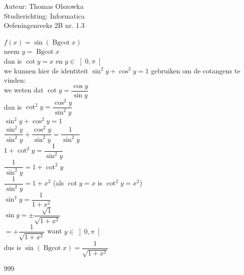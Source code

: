\documentclass[a4paper]{article}
\newcommand{\Bgcot}{\operatorname{Bgcot}}
\begin{document}
\noindent \large Auteur: Thomas Olszowka \\
\noindent \large Studierichting: Informatica\\
\noindent \large Oefeningenreeks 2B nr. 1.3\\

\medskip

\normalsize

$f(x) = \sin(\Bgcot x)$ \\

neem $y = \Bgcot x$ \\

dan is $\cot y = x$ en $y \in \left]0, \pi\right[ $\\

we kunnen hier de identiteit $\sin^2y + \cos^2y  = 1$ gebruiken om de cotangens te vinden: \\

we weten dat $\cot y = \dfrac{\cos y}{\sin y}$ \\

dan is $\cot^2 y = \dfrac{\cos^2 y}{\sin^2 y}$ \\

$\sin^2y + \cos^2y  = 1$\\

$\dfrac{\sin^2 y}{\sin^2 y} + \dfrac{\cos^2 y}{\sin^2 y} = \dfrac{1}{\sin^2 y}$ \\

$1 + \cot^2 y = \dfrac{1}{\sin^2 y}$ \\

$\dfrac{1}{\sin^2 y} = 1 + \cot^2 y$\\

$\dfrac{1}{\sin^2 y}= 1 + x^2$  (als $\cot y = x$ is $\cot^2 y = x^2$) \\

$\sin^2 y = \dfrac{1}{1 + x^2}$\\

$\sin y = \pm \dfrac{\sqrt{1}}{\sqrt{1 + x^2}}$ \\

$= +\dfrac{1}{\sqrt{1 + x^2}}$ want $y \in \left]0, \pi\right[$\\

dus is $\sin(\Bgcot x) = \dfrac{1}{\sqrt{1 + x^2}}$

\begin{thebibliography}{999}
\end{thebibliography}
\end{document}
